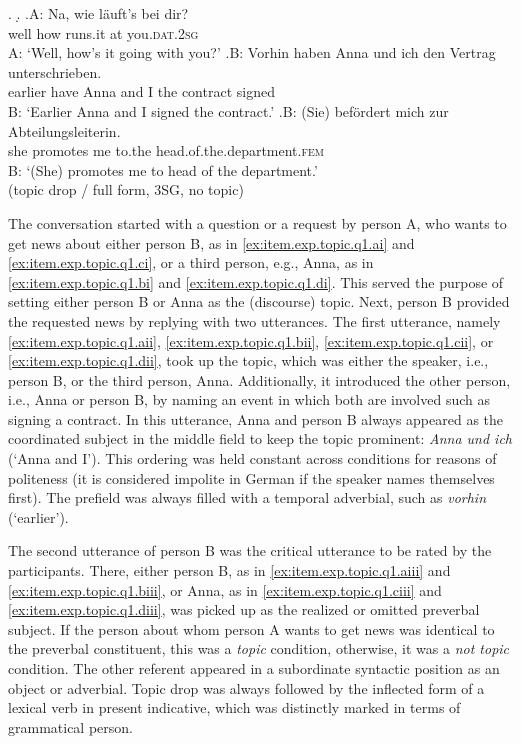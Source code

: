\z.
\d. 
\ag.\label{ex:item.exp.topic.q1.di}A: Na, wie läuft's bei dir?\\
{} well how runs.it at you.\textsc{dat.2sg}\\
A: `Well, how's it going with you?'
\bg.\label{ex:item.exp.topic.q1.dii}B: Vorhin haben Anna und ich den Vertrag unterschrieben.\\
{} earlier have Anna and I the contract signed\\
B: `Earlier Anna and I signed the contract.'
\cg.\label{ex:item.exp.topic.q1.diii}B: (Sie) befördert mich zur Abteilungsleiterin.\\
{} she promotes me to.the head.of.the.department.\textsc{fem}\\
B: `(She) promotes me to head of the department.'  \\\phantom{.}\hfill (topic drop / full form, 3SG, no topic)

\largerpage
The conversation started with a question or a request by person A, who wants to get news about either person B, as in \ref{ex:item.exp.topic.q1.ai} and \ref{ex:item.exp.topic.q1.ci}, or a third person, e.g., Anna, as in \ref{ex:item.exp.topic.q1.bi} and \ref{ex:item.exp.topic.q1.di}.
This served the purpose of setting either person B or Anna as the (discourse) topic.
Next, person B provided the requested news by replying with two utterances.
The first utterance, namely \ref{ex:item.exp.topic.q1.aii}, \ref{ex:item.exp.topic.q1.bii}, \ref{ex:item.exp.topic.q1.cii}, or \ref{ex:item.exp.topic.q1.dii}, took up the topic, which was either the speaker, i.e., person B, or the third person, Anna.
Additionally, it introduced the other person, i.e., Anna or person B, by naming an event in which both are involved such as signing a contract.
In this utterance, Anna and person B always appeared as the coordinated subject in the middle field to keep the topic prominent: \textit{Anna und ich} (`Anna and I').
This ordering was held constant across conditions for reasons of politeness (it is considered impolite in German if the speaker names themselves first).
The prefield was always filled with a temporal adverbial, such as \textit{vorhin} (`earlier').

The second utterance of person B was the critical utterance to be rated by the participants.
There, either person B, as in \ref{ex:item.exp.topic.q1.aiii} and \ref{ex:item.exp.topic.q1.biii}, or Anna, as in \ref{ex:item.exp.topic.q1.ciii} and \ref{ex:item.exp.topic.q1.diii}, was picked up as the realized or omitted preverbal subject.
If the person about whom person A wants to get news was identical to the preverbal constituent, this was a \textit{topic} condition, otherwise, it was a \textit{not topic} condition.
The other referent appeared in a subordinate syntactic position as an object or adverbial.
Topic drop was always followed by the inflected form of a lexical verb  in present indicative, which was distinctly marked in terms of grammatical person.

